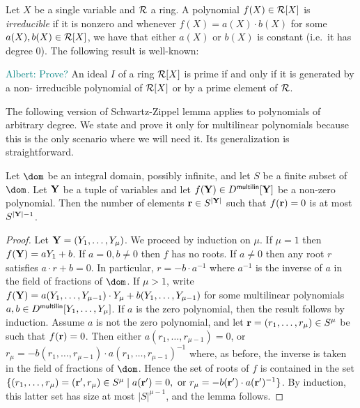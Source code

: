 \documentclass[11pt,letterpaper,usenames,dvipsnames]{article}
\newcommand{\albert}[1]{\textcolor{teal}{Albert: {#1}}}
\begin{document}
Let $X$ be a single variable and $\mathcal{R}$ a ring. A polynomial $f(X)\in \mathcal{R}[X]$ is \emph{irreducible} if it is nonzero and whenever $f(X)=a(X)\cdot b(X)$ for some $a(X), b(X)\in \mathcal{R}[X]$, we have that either $a(X)$ or $b(X)$ is constant (i.e.\ it has degree $0$). The following result is well-known:
\begin{remark}\label{r: prime_ideals_of_RX}
\albert{Prove?} An ideal $I$ of a ring $\mathcal{R}[X]$ is prime if and only if it is generated by a non- irreducible polynomial of $\mathcal{R}[X]$ or by a prime element of $\mathcal{R}$.
\end{remark}

The following version of Schwartz-Zippel lemma applies to polynomials of arbitrary degree. We state and prove it only for multilinear polynomials because this is the only scenario where we will need it. Its generalization is straightforward.
\begin{lemma}\label{l: SZ_for_integral_domains}
%
Let $\dom$ be an integral domain, possibly infinite, and let $S$ be a finite subset of $\dom$. Let $\mathbf{Y}$ be a tuple of variables and let $f(\mathbf{Y})\in D^{\mathsf{multilin}}[\mathbf{Y}]$ be a non-zero polynomial. Then the number of elements $\mathbf{r}\in S^{|\mathbf{Y}|}$ such that $f(\mathbf{r})=0$ is at most $S^{|\mathbf{Y}|-1}$. 
%
\end{lemma}
\begin{proof}
Let $\mathbf{Y}=(Y_1,\ldots, Y_\mu)$. We proceed by induction on $\mu$. If $\mu=1$ then $f(\mathbf{Y}) = a Y_1 + b$. If $a=0, b\neq 0$ then $f$ has no roots. If $a\neq 0$ then any root $r$ satisfies $a\cdot r + b = 0$. In particular, $r = -b\cdot a^{-1}$ where $a^{-1}$ is the inverse of $a$ in the field of fractions of $\dom$. If $\mu > 1$, write  $f(\mathbf{Y}) = a(Y_1,\ldots, Y_{\mu-1}) \cdot Y_\mu +  b(Y_1,\ldots, Y_{\mu-1})$ for some multilinear polynomials $a,b\in D^{\mathsf{multilin}}[Y_1,\ldots, Y_\mu]$. If $a$ is the zero polynomial, then the result follows by induction. Assume $a$ is not the zero polynomial, and let  $\mathbf{r}=(r_1,\ldots, r_{\mu}) \in  S^{\mu}$ be such that $f(\mathbf{r})=0$. Then either $a(r_1,\ldots, r_{\mu-1})=0$, or $r_\mu = -b(r_1,\ldots, r_{\mu-1})\cdot a(r_1,\ldots, r_{\mu-1})^{-1}$ where, as before, the inverse is taken in the field of fractions of $\dom$.  Hence the set of roots of $f$  is contained in the set $\{(r_1,\ldots,r_\mu)=(\mathbf{r}',r_\mu) \in S^\mu \mid a(\mathbf{r}')= 0, \text{ or } r_\mu = -b(\mathbf{r}')\cdot a(\mathbf{r}')^{-1}\}$. By induction, this latter set has size at most $|S|^{\mu-1}$, and the lemma follows. 
%
\end{proof}
\end{document}
